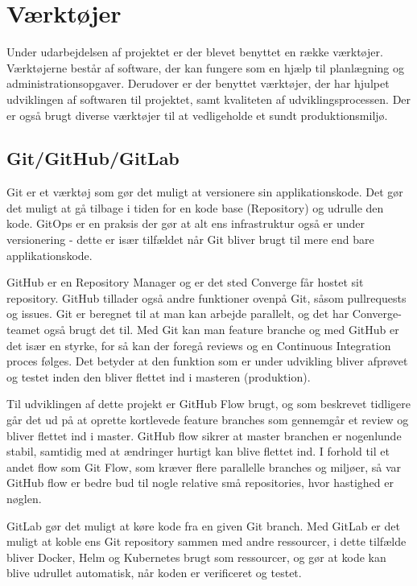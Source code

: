 \section{Værktøjer}

Under udarbejdelsen af projektet er der blevet benyttet en række værktøjer. Værktøjerne består af software, der kan fungere som en hjælp til planlægning og administrationsopgaver. Derudover er der benyttet værktøjer, der har hjulpet udviklingen af softwaren til projektet, samt kvaliteten af udviklingsprocessen. Der er også brugt diverse værktøjer til at vedligeholde et sundt produktionsmiljø.

\subsection{Git/GitHub/GitLab}

Git er et værktøj som gør det muligt at versionere sin applikationskode. Det gør det muligt at gå tilbage i tiden for en kode base (Repository) og udrulle den kode. GitOps er en praksis der gør at alt ens infrastruktur også er under versionering - dette er især tilfældet når Git bliver brugt til mere end bare applikationskode.

GitHub er en Repository Manager og er det sted Converge får hostet sit repository. GitHub tillader også andre funktioner ovenpå Git, såsom pullrequests og issues. Git er beregnet til at man kan arbejde parallelt, og det har Converge-teamet også brugt det til. Med Git kan man feature branche og med GitHub er det især en styrke, for så kan der foregå reviews og en Continuous Integration proces følges. Det betyder at den funktion som er under udvikling bliver afprøvet og testet inden den bliver flettet ind i masteren (produktion).

Til udviklingen af dette projekt er GitHub Flow brugt, og som beskrevet tidligere går det ud på at oprette kortlevede feature branches som gennemgår et review og bliver flettet ind i master. GitHub flow sikrer at master branchen er nogenlunde stabil, samtidig med at ændringer hurtigt kan blive flettet ind. I forhold til et andet flow som Git Flow, som kræver flere parallelle branches og miljøer, så var GitHub flow er bedre bud til nogle relative små repositories, hvor hastighed er nøglen.

GitLab gør det muligt at køre kode fra en given Git branch. Med GitLab er det muligt at koble ens Git repository sammen med andre ressourcer, i dette tilfælde bliver Docker, Helm og Kubernetes brugt som ressourcer, og gør at kode kan blive udrullet automatisk, når koden er verificeret og testet.


